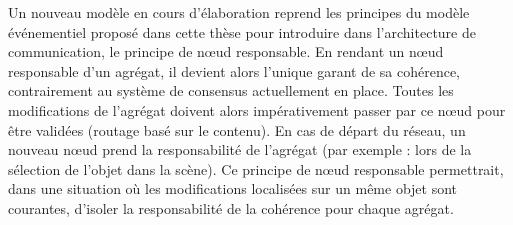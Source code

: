 Un nouveau modèle en cours d'élaboration reprend les principes du modèle événementiel 
proposé dans cette thèse pour introduire dans l'architecture de communication, le 
principe de \og n\oe ud responsable\fg{}. En rendant un n\oe ud responsable d'un 
agrégat, il devient alors l'unique garant de sa cohérence, contrairement au 
système de consensus actuellement en place. Toutes les modifications de 
l'agrégat doivent alors impérativement passer par ce n\oe ud pour être validées 
(routage basé sur le contenu). 
En cas de départ du réseau, un nouveau n\oe ud prend la responsabilité de 
l'agrégat (par exemple : lors de la sélection de l'objet dans la scène). 
Ce principe de \og n\oe ud responsable\fg{} permettrait, dans une situation où les 
modifications localisées sur un même objet sont courantes, d'isoler la 
responsabilité de la cohérence pour chaque agrégat. 


%



